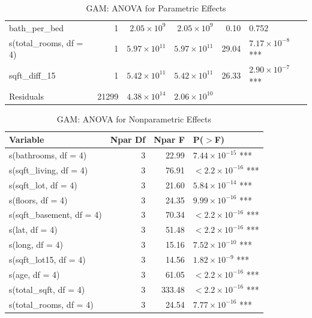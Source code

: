 \documentclass[a4paper, 11pt]{article}
\begin{document}
\begin{table}[ht]
\begin{tabular}{|l|r|r|r|r|l|}
bath\_per\_bed & 1 & $2.05 \times 10^{9}$ & $2.05 \times 10^{9}$ & 0.10 & 0.752 \\
s(total\_rooms, df = 4) & 1 & $5.97 \times 10^{11}$ & $5.97 \times 10^{11}$ & 29.04 & $7.17 \times 10^{-8}$ *** \\
sqft\_diff\_15 & 1 & $5.42 \times 10^{11}$ & $5.42 \times 10^{11}$ & 26.33 & $2.90 \times 10^{-7}$ *** \\
\hline
Residuals & 21299 & $4.38 \times 10^{14}$ & $2.06 \times 10^{10}$ & & \\
\hline
\end{tabular}
\caption{GAM: ANOVA for Parametric Effects}
\label{tab:gamanova}
\end{table}

\begin{table}[ht]
\centering
\begin{tabular}{|l|r|r|l|}
\hline
\textbf{Variable} & \textbf{Npar Df} & \textbf{Npar F} & \textbf{P($>$F)} \\
\hline
s(bathrooms, df = 4) & 3 & 22.99 & $7.44 \times 10^{-15}$ *** \\
s(sqft\_living, df = 4) & 3 & 76.91 & $< 2.2 \times 10^{-16}$ *** \\
s(sqft\_lot, df = 4) & 3 & 21.60 & $5.84 \times 10^{-14}$ *** \\
s(floors, df = 4) & 3 & 24.35 & $9.99 \times 10^{-16}$ *** \\
s(sqft\_basement, df = 4) & 3 & 70.34 & $< 2.2 \times 10^{-16}$ *** \\
s(lat, df = 4) & 3 & 51.48 & $< 2.2 \times 10^{-16}$ *** \\
s(long, df = 4) & 3 & 15.16 & $7.52 \times 10^{-10}$ *** \\
s(sqft\_lot15, df = 4) & 3 & 14.56 & $1.82 \times 10^{-9}$ *** \\
s(age, df = 4) & 3 & 61.05 & $< 2.2 \times 10^{-16}$ *** \\
s(total\_sqft, df = 4) & 3 & 333.48 & $< 2.2 \times 10^{-16}$ *** \\
s(total\_rooms, df = 4) & 3 & 24.54 & $7.77 \times 10^{-16}$ *** \\
\hline
\end{tabular}
\caption{GAM: ANOVA for Nonparametric Effects}
\label{tab:gamanovanonparametric}
\end{table}
\end{document}
